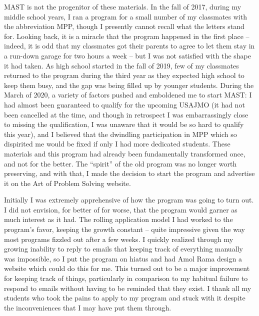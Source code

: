 \documentclass[blue,onecol]{shooting}
\begin{document}
MAST is not the progenitor of these materials. In the fall of 2017, during my middle school years, I ran a program for a small number of my classmates with the abbreviation MPP, though I presently cannot recall what the letters stand for. Looking back, it is a miracle that the program happened in the first place -- indeed, it is odd that my classmates got their parents to agree to let them stay in a run-down garage for two hours a week -- but I was not satisfied with the shape it had taken. As high school started in the fall of 2019, few of my classmates returned to the program during the third year as they expected high school to keep them busy, and the gap was being filled up by younger students. During the March of 2020, a variety of factors pushed and emboldened me to start MAST: I had almost been guaranteed to qualify for the upcoming USAJMO (it had not been cancelled at the time, and though in retrospect I was embarrassingly close to missing the qualification, I was unaware that it would be so hard to qualify this year), and I believed that the dwindling participation in MPP which so dispirited me would be fixed if only I had more dedicated students. These materials and this program had already been fundamentally transformed once, and not for the better. The ``spirit'' of the old program was no longer worth preserving, and with that, I made the decision to start the program and advertise it on the Art of Problem Solving website.

Initially I was extremely apprehensive of how the program was going to turn out. I did not envision, for better of for worse, that the program would garner as much interest as it had. The rolling application model I had worked to the program's favor, keeping the growth constant -- quite impressive given the way most programs fizzled out after a few weeks. I quickly realized through my growing inability to reply to emails that keeping track of everything manually was impossible, so I put the program on hiatus and had Amol Rama design a website which could do this for me. This turned out to be a major improvement for keeping track of things, particularly in comparison to my habitual failure to respond to emails without having to be reminded that they exist. I thank all my students who took the pains to apply to my program and stuck with it despite the inconveniences that I may have put them through.
\end{document}
